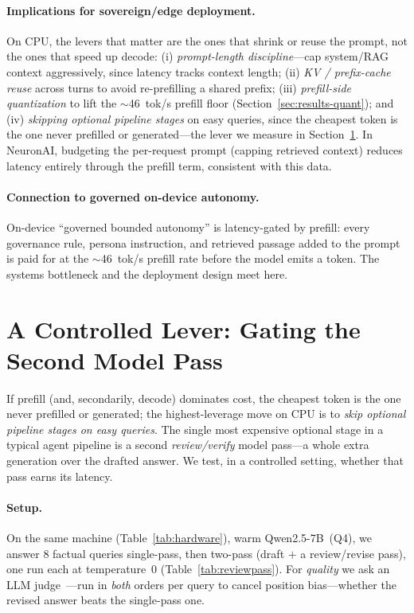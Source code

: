 \documentclass[sigconf,nonacm,10pt]{acmart}
\begin{document}
\paragraph{Implications for sovereign/edge deployment.}
On CPU, the levers that matter are the ones that shrink or reuse the
prompt, not the ones that speed up decode: (i) \emph{prompt-length
discipline}---cap system/RAG context aggressively, since latency tracks
context length; (ii) \emph{KV / prefix-cache reuse} across turns to avoid
re-prefilling a shared prefix; (iii) \emph{prefill-side quantization} to
lift the $\sim$46~tok/s prefill floor (Section~\ref{sec:results-quant}); and
(iv) \emph{skipping optional pipeline stages} on easy queries, since the
cheapest token is the one never prefilled or generated---the lever we
measure in Section~\ref{sec:lever}. In NeuronAI, budgeting the per-request
prompt (capping retrieved context) reduces latency entirely through the
prefill term, consistent with this data.

\paragraph{Connection to governed on-device autonomy.}
On-device ``governed bounded autonomy'' is latency-gated by prefill: every
governance rule, persona instruction, and retrieved passage added to the
prompt is paid for at the $\sim$46~tok/s prefill rate before the model
emits a token. The systems bottleneck and the deployment design meet here.

\section{A Controlled Lever: Gating the Second Model Pass}
\label{sec:lever}
If prefill (and, secondarily, decode) dominates cost, the cheapest token is
the one never prefilled or generated; the highest-leverage move on CPU is to
\emph{skip optional pipeline stages on easy queries}. The single most
expensive optional stage in a typical agent pipeline is a second
\emph{review/verify} model pass---a whole extra generation over the drafted
answer. We test, in a controlled setting, whether that pass earns its
latency.

\paragraph{Setup.}
On the same machine (Table~\ref{tab:hardware}), warm Qwen2.5-7B~(Q4), we
answer 8 factual queries single-pass, then two-pass (draft $+$ a
review/revise pass), one run each at temperature~0
(Table~\ref{tab:reviewpass}). For \emph{quality} we ask an LLM
judge~\cite{zheng2023judging}---run in \emph{both} orders per query to cancel
position bias---whether the revised answer beats the single-pass one.
\end{document}

